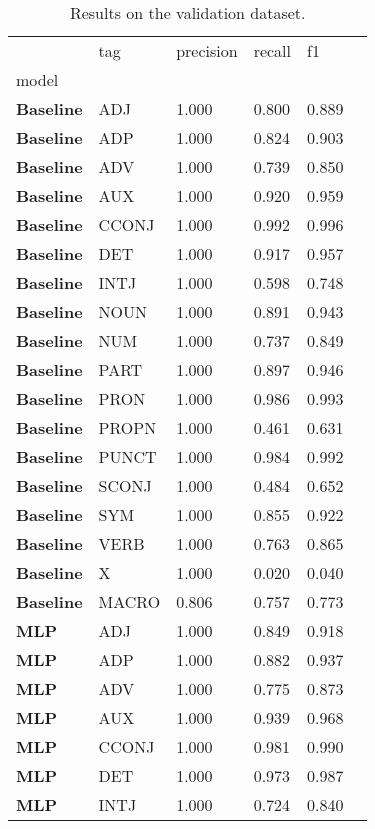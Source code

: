 \begin{table}
\caption{Results on the validation dataset.}
\label{tab::ex_10_valid}
\begin{tabular}{|l|l|l|l|l|l|}
\toprule
 & tag & precision & recall & f1 \\
model &  &  &  &  \\
\midrule
\textbf{Baseline} & ADJ & 1.000 & 0.800 & 0.889 \\
\textbf{Baseline} & ADP & 1.000 & 0.824 & 0.903 \\
\textbf{Baseline} & ADV & 1.000 & 0.739 & 0.850 \\
\textbf{Baseline} & AUX & 1.000 & 0.920 & 0.959 \\
\textbf{Baseline} & CCONJ & 1.000 & 0.992 & 0.996 \\
\textbf{Baseline} & DET & 1.000 & 0.917 & 0.957 \\
\textbf{Baseline} & INTJ & 1.000 & 0.598 & 0.748 \\
\textbf{Baseline} & NOUN & 1.000 & 0.891 & 0.943 \\
\textbf{Baseline} & NUM & 1.000 & 0.737 & 0.849 \\
\textbf{Baseline} & PART & 1.000 & 0.897 & 0.946 \\
\textbf{Baseline} & PRON & 1.000 & 0.986 & 0.993 \\
\textbf{Baseline} & PROPN & 1.000 & 0.461 & 0.631 \\
\textbf{Baseline} & PUNCT & 1.000 & 0.984 & 0.992 \\
\textbf{Baseline} & SCONJ & 1.000 & 0.484 & 0.652 \\
\textbf{Baseline} & SYM & 1.000 & 0.855 & 0.922 \\
\textbf{Baseline} & VERB & 1.000 & 0.763 & 0.865 \\
\textbf{Baseline} & X & 1.000 & 0.020 & 0.040 \\
\textbf{Baseline} & MACRO & 0.806 & 0.757 & 0.773 \\
\textbf{MLP} & ADJ & 1.000 & 0.849 & 0.918 \\
\textbf{MLP} & ADP & 1.000 & 0.882 & 0.937 \\
\textbf{MLP} & ADV & 1.000 & 0.775 & 0.873 \\
\textbf{MLP} & AUX & 1.000 & 0.939 & 0.968 \\
\textbf{MLP} & CCONJ & 1.000 & 0.981 & 0.990 \\
\textbf{MLP} & DET & 1.000 & 0.973 & 0.987 \\
\textbf{MLP} & INTJ & 1.000 & 0.724 & 0.840 \\

\end{tabular}
\end{table}
